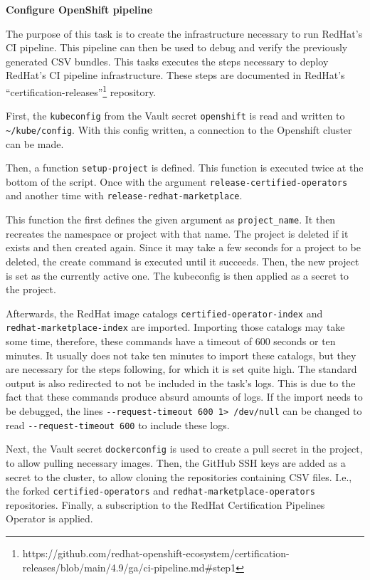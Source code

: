 \textbf{Configure OpenShift pipeline}

The purpose of this task is to create the infrastructure necessary to run RedHat's CI pipeline.
This pipeline can then be used to debug and verify the previously generated CSV bundles.
This tasks executes the steps necessary to deploy RedHat's CI pipeline infrastructure.
These steps are documented in RedHat's ``certification-releases''\footnote{https://github.com/redhat-openshift-ecosystem/certification-releases/blob/main/4.9/ga/ci-pipeline.md\#step1} repository.

First, the \verb|kubeconfig| from the Vault secret \verb|openshift| is read and written to \verb|~/kube/config|.
With this config written, a connection to the Openshift cluster can be made.

Then, a function \verb|setup-project| is defined.
This function is executed twice at the bottom of the script.
Once with the argument \verb|release-certified-operators| and another time with \verb|release-redhat-marketplace|.

This function the first defines the given argument as \verb|project_name|.
It then recreates the namespace or project with that name.
The project is deleted if it exists and then created again.
Since it may take a few seconds for a project to be deleted, the create command is executed until it succeeds.
Then, the new project is set as the currently active one.
The kubeconfig is then applied as a secret to the project.

Afterwards, the RedHat image catalogs \verb|certified-operator-index| and \\ \verb|redhat-marketplace-index| are imported.
Importing those catalogs may take some time, therefore, these commands have a timeout of 600 seconds or ten minutes.
It usually does not take ten minutes to import these catalogs, but they are necessary for the steps following, for which it is set quite high.
The standard output is also redirected to not be included in the task's logs.
This is due to the fact that these commands produce absurd amounts of logs.
If the import needs to be debugged, the lines \verb|--request-timeout 600 1> /dev/null| can be changed to read \verb|--request-timeout 600| to include these logs.

Next, the Vault secret \verb|dockerconfig| is used to create a pull secret in the project, to allow pulling necessary images.
Then, the GitHub SSH keys are added as a secret to the cluster, to allow cloning the repositories containing CSV files.
I.e., the forked \verb|certified-operators| and \verb|redhat-marketplace-operators| repositories.
Finally, a subscription to the RedHat Certification Pipelines Operator is applied.
